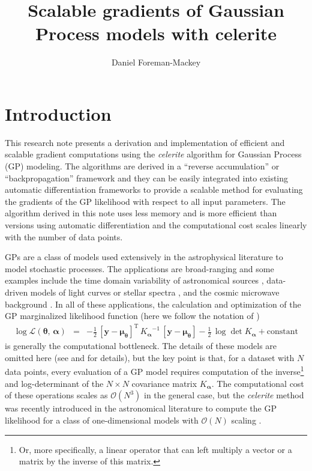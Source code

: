 \documentclass[rnaas]{aastex62}
\newcommand{\eqlabel}[1]{\label{eq:#1}}
\newcommand{\T}{\ensuremath{\mathrm{T}}}
\newcommand{\bvec}[1]{{\ensuremath{\boldsymbol{#1}}}}
\begin{document}
\raggedbottom\sloppy\sloppypar\frenchspacing

\title{%
    Scalable gradients of Gaussian Process models with celerite
}

\author[0000-0002-9328-5652]{Daniel Foreman-Mackey}


\section{Introduction}

This research note presents a derivation and implementation of efficient and
scalable gradient computations using the \emph{celerite} algorithm for Gaussian
Process (GP) modeling.
The algorithms are derived in a ``reverse accumulation'' or
``backpropagation'' framework and they can be easily integrated into existing
automatic differentiation frameworks to provide a scalable method for
evaluating the gradients of the GP likelihood with respect to all input
parameters.
The algorithm derived in this note uses less memory and is more efficient than
versions using automatic differentiation and the computational cost scales
linearly with the number of data points.

GPs \citep{Rasmussen:2006} are a class of models used
extensively in the astrophysical literature to model stochastic processes.
The applications are broad-ranging and some examples include the time domain
variability of astronomical sources \citep{Brewer:2009, Kelly:2014,
Haywood:2014, Rajpaul:2015, Foreman-Mackey:2017, Angus:2018}, data-driven
models of light curves or stellar spectra \citep{Wang:2012, Luger:2016,
Czekala:2017}, and the cosmic microwave background
\citep{Bond:1987,Wandelt:2003}.
In all of these applications, the calculation and optimization of the GP
marginalized likelihood function (here we follow the notation of
\citealt{Foreman-Mackey:2017})
\begin{eqnarray}\eqlabel{loglike}
\log \mathcal{L}(\bvec{\theta},\,\bvec{\alpha}) &=&
    -\frac{1}{2}\,\left[\bvec{y} - \bvec{\mu}_\bvec{\theta}\right]^\T\,
        {K_\bvec{\alpha}}^{-1}\,\left[\bvec{y}-\bvec{\mu}_\bvec{\theta}\right]
    -\frac{1}{2}\,\log\det K_\bvec{\alpha} + \mathrm{constant}
\end{eqnarray}
is generally the computational bottleneck.
The details of these models are omitted here (see \citealt{Rasmussen:2006} and
\citealt{Foreman-Mackey:2017} for details), but the key point is that, for a
dataset with $N$ data points, every evaluation of a GP model requires
computation of the inverse\footnote{Or, more specifically, a linear operator
that can left multiply a vector or a matrix by the inverse of this matrix.}
and log-determinant of the $N \times N$ covariance matrix $K_\bvec{\alpha}$.
The computational cost of these operations scales as $\mathcal{O}(N^3)$ in the
general case, but the \emph{celerite} method was recently introduced in the
astronomical literature to compute the GP likelihood for a class of
one-dimensional models with $\mathcal{O}(N)$ scaling
\citep{Ambikasaran:2015, Foreman-Mackey:2017}.
\end{document}
